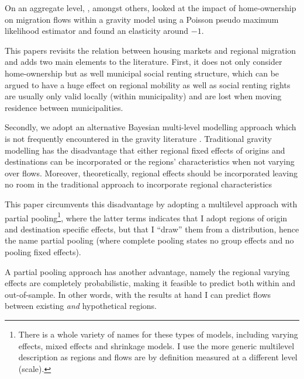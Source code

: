 \documentclass[fleqn,10pt]{SelfArx} %
\begin{document}
        On an aggregate level, \citet{amirault2016drags}, amongst others,
        looked at the impact of home-ownership on migration flows
        within a gravity model using a Poisson pseudo maximum
        likelihood estimator and found an elasticity around
        $-1$. 
        
        This papers revisits the relation between housing markets and
        regional migration and adds two main elements to the
        literature. First, it does not only consider home-ownership
        but as well municipal social renting structure, which can be
        argued to have a huge effect on regional mobility as well as
        social renting rights are usually only valid locally (within
        municipality) and are lost when moving residence between
        municipalities.
        
        Secondly, we adopt an alternative Bayesian multi-level
        modelling approach which is not frequently encountered in the
        gravity literature \citep[a notable exception is][in a trade
        context]{ranjan2007bayesian}. Traditional gravity modelling
        has the disadvantage that either regional fixed effects of
        origins and destinations can be incorporated or the regions'
        characteristics when not varying over flows. Moreover,
        theoretically, regional effects should be incorporated leaving
        no room in the traditional approach to incorporate regional
        characteristics

        This paper circumvents this disadvantage by adopting a
        multilevel approach with partial pooling\footnote{There is a
          whole variety of names for these types of models, including
          varying effects, mixed effects and shrinkage models. I use
          the more generic multilevel description as regions and flows
          are by definition measured at a different level (scale).},
        where the latter terms indicates that I adopt regions of
        origin and destination specific effects, but that I ``draw''
        them from a distribution, hence the name partial pooling
        (where complete pooling states no group effects and no pooling
        fixed effects).

        A partial pooling approach has another advantage, namely the
        regional varying effects are completely probabilistic, making
        it feasible to predict both within and out-of-sample. In other
        words, with the results at hand I can predict flows between
        existing \emph{and} hypothetical regions.
\end{document}
